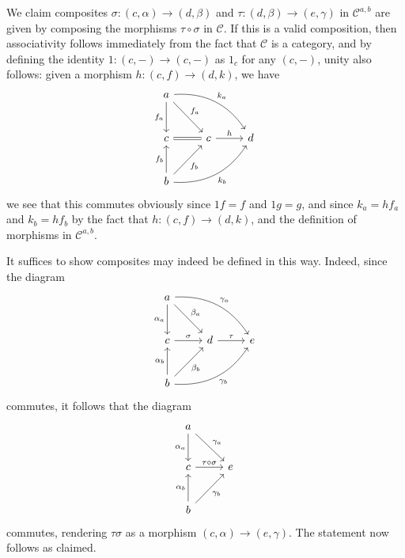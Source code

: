 \documentclass[11pt, letterpaper]{article}
\begin{document}
\begin{enumerate}
		We claim composites $\sigma : (c,\alpha ) \to (d,\beta )$ and $\tau : (d,\beta ) \to (e,\gamma )$ in $\mathcal{C} ^{a,b} $ are given by composing the morphisms $\tau \circ \sigma $ in $\mathcal{C} $. If this is a valid composition, then associativity follows immediately from the fact that $\mathcal{C} $ is a category, and by defining the identity $1:(c,-)\to (c,-)$ as $1_c$ for any $(c,-)$, unity also follows: given a morphism $h : (c,f) \to (d,k)$, we have
		\[\begin{tikzcd}[row sep = 2.5em, column sep = 2.5em]
		a \ar[" f_a "', d] \ar[" f_a ", dr] \ar[" k_a ", bend left, drr]  &  \\
		c \ar[equals, r]  & c \ar[" h ", r] & d\\
		b \ar[" f_b "', ur] \ar[" f_b ", u] \ar[" k_b "', bend right, urr]  & 
		\end{tikzcd}\]
		we see that this commutes obviously since $1f=f$ and $1g=g$, and since $k_a=hf_a$ and $k_b=hf_b$ by the fact that $h : (c,f) \to (d,k)$, and the definition of morphisms in $\mathcal{C} ^{a,b} $.

		It suffices to show composites may indeed be defined in this way. Indeed, since the diagram
		\[\begin{tikzcd}[row sep = 2.5em, column sep = 2.5em]
		a \ar[" \alpha _a "', d] \ar[" \beta _a ", dr] \ar[" \gamma _a ", bend left, drr]  &  &  \\
		c \ar[" \sigma  ", r]  & d \ar[" \tau  ", r]  & e \\
		b \ar[" \beta _b "', ur] \ar[" \gamma _b "', bend right, urr]  \ar[" \alpha _b ", u]  &  & 
		\end{tikzcd}\]
		commutes, it follows that the diagram
		\[\begin{tikzcd}[row sep = 2.5em, column sep = 2.5em]
		a \ar[" \alpha _a "', d] \ar[" \gamma _a ", dr]  &  \\
		c \ar[" \tau \circ \sigma  ", r]  & e \\
		b \ar[" \alpha _b ", u] \ar[" \gamma _b "', ur]  & 
		\end{tikzcd}\]
		commutes, rendering $\tau \sigma $ as a morphism $(c,\alpha )\to (e,\gamma )$. The statement now follows as claimed.
\end{enumerate}
\end{document}
